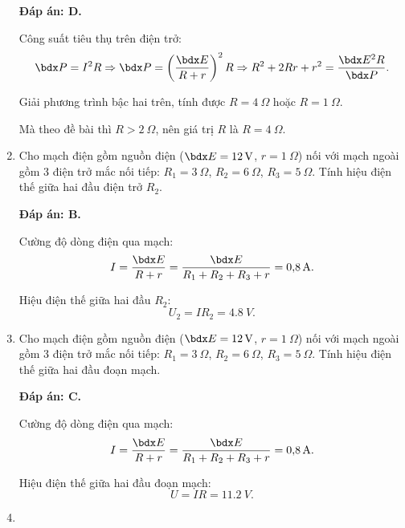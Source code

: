 \begin{enumerate}[label=\bfseries Câu \arabic*:]
{	}
	\loigiai
	{	\textbf{Đáp án: D.}
		
		Công suất tiêu thụ trên điện trở:
		$$\calP = I^2 R \Rightarrow \calP = \left(\dfrac{\calE}{R + r}\right)^2 R \Rightarrow R^2 + 2Rr + r^2 = \dfrac{\calE^2 R}{\calP}.$$
		
		Giải phương trình bậc hai trên, tính được $R=\SI{4}{\Omega}$ hoặc $R=\SI{1}{\Omega}$.
		
		Mà theo đề bài thì $R>\SI{2}{\Omega}$, nên giá trị $R$ là $R=\SI{4}{\Omega}$.
	}
	\item {}
	
	\cauhoi
	{Cho mạch điện gồm nguồn điện ($\calE=\SI{12}{V}$, $r=\SI{1}{\Omega}$) nối với mạch ngoài gồm 3 điện trở mắc nối tiếp: $R_1=\SI{3}{\Omega}$, $R_2=\SI{6}{\Omega}$, $R_3=\SI{5}{\Omega}$. Tính hiệu điện thế giữa hai đầu điện trở $R_2$.
		
	}
	\loigiai
	{	\textbf{Đáp án: B.}
		
		Cường độ dòng điện qua mạch:
		$$I=\dfrac{\calE}{R + r} = \dfrac{\calE}{R_1 + R_2 + R_3 + r} = \SI{0.8}{A}.$$
		
		Hiệu điện thế giữa hai đầu $R_2$:
		$$U_2 = I R_2 = \SI{4.8}{V}.$$
	}
	\item {}
	
	\cauhoi
	{Cho mạch điện gồm nguồn điện ($\calE=\SI{12}{V}$, $r=\SI{1}{\Omega}$) nối với mạch ngoài gồm 3 điện trở mắc nối tiếp: $R_1=\SI{3}{\Omega}$, $R_2=\SI{6}{\Omega}$, $R_3=\SI{5}{\Omega}$. Tính hiệu điện thế giữa hai đầu đoạn mạch.
		
	}
	\loigiai
	{	\textbf{Đáp án: C.}
		
		Cường độ dòng điện qua mạch:
		$$I=\dfrac{\calE}{R + r} = \dfrac{\calE}{R_1 + R_2 + R_3 + r} = \SI{0.8}{A}.$$
		
		Hiệu điện thế giữa hai đầu đoạn mạch:
		$$U=IR = \SI{11.2}{V}.$$
	}
	\item {}
	

\end{enumerate}
